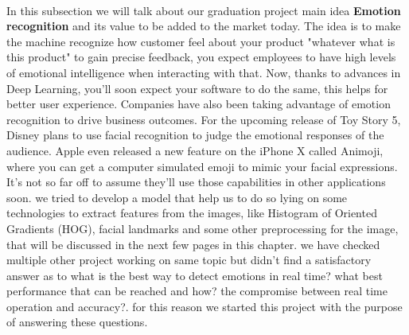 \paragraph{}
In this subsection we will talk about our graduation project main idea
\textbf{Emotion recognition} and its value to be added to the market today.
\newline
The idea is to make the machine recognize how customer feel about your product "whatever what is this product" to gain precise feedback, you expect employees to have high levels of emotional intelligence when interacting with that. Now, thanks to advances in Deep Learning, you’ll soon expect your software to do the same, this helps for better user experience.
\bigbreak
Companies have also been taking advantage of emotion recognition to drive business outcomes. For the upcoming release of Toy Story 5, Disney plans to use facial recognition to judge the emotional responses of the audience. Apple even released a new feature on the iPhone X called Animoji, where you can get a computer simulated emoji to mimic your facial expressions. It’s not so far off to assume they’ll use those capabilities in other applications soon.
\bigbreak
we tried to develop a model that help us to do so lying on some technologies to extract features from the images, like Histogram of Oriented Gradients (HOG), facial landmarks and some other preprocessing for the image, that will be discussed in the next few pages in this chapter.\newline
we have checked multiple other project working on same topic but didn't find a satisfactory answer as to what is the best way to detect emotions in real time? what best performance that can be reached and how? the compromise between real time operation and accuracy?.
for this reason we started this project with the purpose of answering these questions.